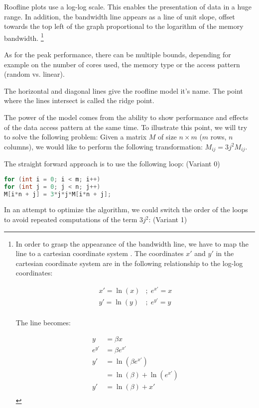 \documentclass[a4paper,12pt]{article}
\begin{document}
Roofline plots use a log-log scale. This enables the presentation of data in a
huge range. In addition, the bandwidth line appears as a line of unit slope,
offset towards the top left of the graph proportional to the logarithm of the
memory bandwidth.
\footnote{ In order to grasp the appearance of the bandwidth line, we have to
map the line to a cartesian coordinate system .
The coordinates $x'$ and $y'$ in the cartesian coordinate system are in the
following relationship to the log-log coordinates:

\begin{align*}
x'=\ln(x)&;\; e^{x'}=x\\
y'=\ln(y)&;\; e^{y'}=y\\
\end{align*}

The line becomes:

\begin{align*}
y&=\beta x\\
e^{y'}&=\beta e^{x'}\\
y'&=\ln(\beta e^{x'})\\
&=\ln(\beta) + \ln(e^{x'})\\
y'&=\ln(\beta) + x'\\
\end{align*}
}

As for the peak performance, there can be multiple bounds, depending for example
on the number of cores used, the memory type or the access pattern (random vs.
linear).

The horizontal and diagonal lines give the roofline model it's name. The point
where the lines intersect is called the ridge point.

The power of the model comes from the ability to show performance and
effects of the data access pattern at the same time. To illustrate this point,
we will try to solve the following problem: Given a matrix $M$ of size
$n\times m$ ($m$ rows, $n$ columns), we would like to perform the following
transformation: $M_{ij}=3j^2M_{ij}$.

The straight forward approach is to use the following loop: (Variant 0)
\begin{lstlisting}[language=C] 
for (int i = 0; i < m; i++) 
for (int j = 0; j < n; j++)
M[i*n + j] = 3*j*j*M[i*n + j];
\end{lstlisting}

In an attempt to optimize the algorithm, we could switch the order of the loops
to avoid repeated computations of the term $3j^2$: (Variant 1)
\end{document}
